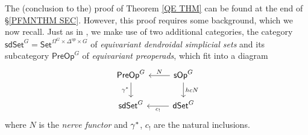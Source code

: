 \documentclass[a4paper,10pt
,draft
]{article}%
\numberwithin{equation}{section}
\numberwithin{figure}{section}
\theoremstyle{definition} %
\newcommand{\1}{\ensuremath{\mathbbm 1}}%
\begin{document}
The (conclusion to the) proof of Theorem \ref{QE THM}
can be found at the end of \S \ref{PFMNTHM SEC}.
However, this proof requires some background, which we now recall.
Just as in \cite{CM13b},
we make use of two additional categories,
the category 
$\mathsf{sdSet}^G
= \mathsf{Set}^{\Omega^G\times \Delta^{op} \times G}$
of \emph{equivariant dendroidal simplicial sets}
and its 
subcategory
$\mathsf{PreOp}^G$
of \emph{equivariant preoperads}, which fit into a diagram
\begin{equation}\label{ADJSQ EQ}
	\begin{tikzcd}
	\mathsf{PreOp}^G \ar{d}[swap]{\gamma^{\**}}&
	\mathsf{sOp}^G \ar{l}[swap]{N} \ar{d}{hcN}
\\
	\mathsf{sdSet}^G &
	\mathsf{dSet}^G \ar{l}{c_{!}}
	\end{tikzcd}
\end{equation}
where $N$ is the \emph{nerve functor}
and $\gamma^{\**}$, $c_!$ are the natural inclusions.
\end{document}
